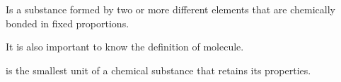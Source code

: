 %
\begin{definition}
    Is a substance formed by two or more different elements that are chemically bonded in fixed proportions.
\end{definition}
It is also important to know the definition of molecule.
\begin{definition}[Molecule]
    is the smallest unit of a chemical substance that retains its properties.
\end{definition}
